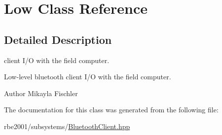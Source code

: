 \hypertarget{class_low}{}\section{Low Class Reference}
\label{class_low}


\subsection{Detailed Description}
client I/O with the field computer.

Low-\/level bluetooth client I/O with the field computer. \begin{DoxyAuthor}{Author}
Mikayla Fischler 
\end{DoxyAuthor}


The documentation for this class was generated from the following file\+:\begin{DoxyCompactItemize}
\item 
rbe2001/subsystems/\hyperlink{_bluetooth_client_8hpp}{Bluetooth\+Client.\+hpp}\end{DoxyCompactItemize}
